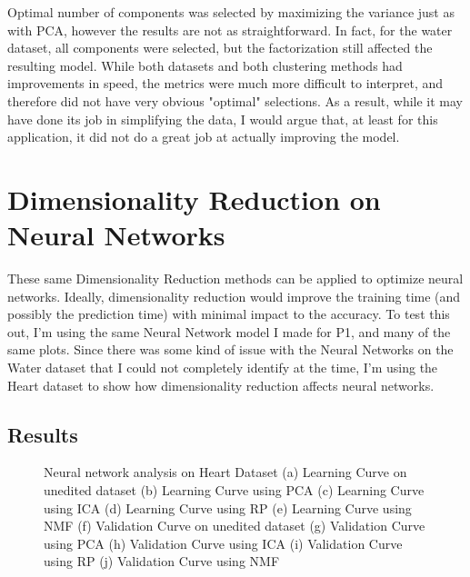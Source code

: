 \documentclass[
	letterpaper, %
]{mlreport}
\begin{document}
Optimal number of components was selected by maximizing the variance just as with PCA, however the results are not as straightforward. In fact, for the water dataset, all components were selected, but the factorization still affected the resulting model. While both datasets and both clustering methods had improvements in speed, the metrics were much more difficult to interpret, and therefore did not have very obvious "optimal" selections. As a result, while it may have done its job in simplifying the data, I would argue that, at least for this application, it did not do a great job at actually improving the model.

\section{Dimensionality Reduction on Neural Networks}
These same Dimensionality Reduction methods can be applied to optimize neural networks. Ideally, dimensionality reduction would improve the training time (and possibly the prediction time) with minimal impact to the accuracy. To test this out, I'm using the same Neural Network model I made for P1, and many of the same plots. Since there was some kind of issue with the Neural Networks on the Water dataset that I could not completely identify at the time, I'm using the Heart dataset to show how dimensionality reduction affects neural networks.

\subsection{Results}
\begin{figure}
	\centering
	\caption{Neural network analysis on Heart Dataset (a) Learning Curve on unedited dataset (b) Learning Curve using PCA (c) Learning Curve using ICA (d) Learning Curve using RP (e) Learning Curve using NMF (f) Validation Curve on unedited dataset (g) Validation Curve using PCA (h) Validation Curve using ICA (i) Validation Curve using RP (j) Validation Curve using NMF}
	\label{fig:fig7}
\end{figure}
\end{document}
